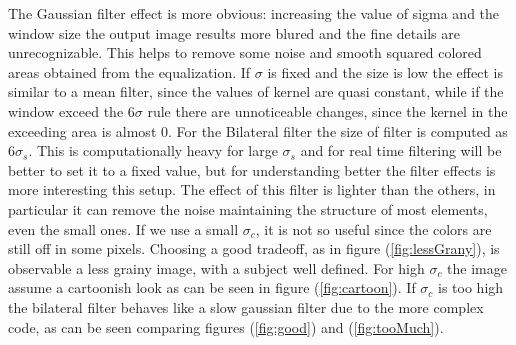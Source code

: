 \documentclass[11pt,a4paper]{article}
\begin{document}
The Gaussian filter effect is more obvious: increasing the value of sigma and the window size the output image results more blured and the fine details are unrecognizable.
This helps to remove some noise and smooth squared colored areas obtained from the equalization.
If $\sigma$ is fixed and the size is low the effect is similar to a mean filter, since the values of kernel are quasi constant, while if the window exceed the 6$\sigma$ rule there are unnoticeable changes, since the kernel in the exceeding area is almost 0.\newline
For the Bilateral filter the size of filter is computed as $6\sigma_{s}$. This is computationally heavy for large $\sigma_s$ and for real time filtering will be better to set it to a fixed value, but for understanding better the filter effects is more interesting this setup.
The effect of this filter is lighter than the others, in particular it can remove the noise maintaining the structure of most elements, even the small ones.
If we use a small $\sigma_c$, it is not so useful since the colors are still off in some pixels.
Choosing a good tradeoff, as in figure (\ref{fig:lessGrany}), is observable a less grainy image, with a subject well defined.
For high $\sigma_c$ the image assume a cartoonish look as can be seen in figure (\ref{fig:cartoon}). If $\sigma_c$ is too high the bilateral filter behaves like a slow gaussian filter due to the more complex code, as can be seen comparing figures (\ref{fig:good}) and (\ref{fig:tooMuch}).
\end{document}
